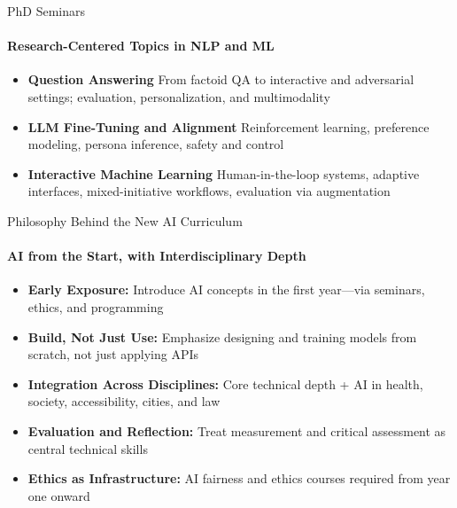 \documentclass[compress]{beamer}
\begin{document}
\begin{frame}{PhD Seminars}
\framesubtitle{Research-Centered Topics in NLP and ML}
\begin{itemize}
  \item \textbf{Question Answering}  
        From factoid QA to interactive and adversarial settings; evaluation, personalization, and multimodality

  \item \textbf{LLM Fine-Tuning and Alignment}  
        Reinforcement learning, preference modeling, persona inference, safety and control

  \item \textbf{Interactive Machine Learning}  
        Human-in-the-loop systems, adaptive interfaces, mixed-initiative workflows, evaluation via augmentation
\end{itemize}
\end{frame}


\begin{frame}{Philosophy Behind the New AI Curriculum}
\framesubtitle{AI from the Start, with Interdisciplinary Depth}
\begin{itemize}
  \item \textbf{Early Exposure:}  
        Introduce AI concepts in the first year—via seminars, ethics, and programming

  \item \textbf{Build, Not Just Use:}  
        Emphasize designing and training models from scratch, not just applying APIs

  \item \textbf{Integration Across Disciplines:}  
        Core technical depth + AI in health, society, accessibility, cities, and law

  \item \textbf{Evaluation and Reflection:}  
        Treat measurement and critical assessment as central technical skills

  \item \textbf{Ethics as Infrastructure:}  
        AI fairness and ethics courses required from year one onward
\end{itemize}
\end{frame}
\end{document}
